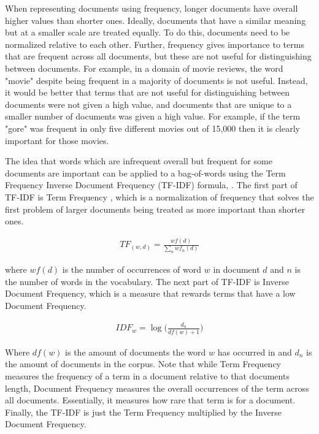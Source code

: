 When representing documents using  frequency, longer documents have overall higher values than shorter ones. Ideally, documents that have a similar meaning but at a smaller scale are treated equally. To do this, documents need to be normalized relative to each other. Further, frequency gives  importance to terms that are frequent across all documents, but these are not useful for distinguishing between documents. For example, in a domain of movie reviews, the word "movie" despite being frequent in a majority of documents is not useful. Instead, it would be better that terms that are not useful for distinguishing between documents were not given a high value, and documents that are unique to a smaller number of documents was given a high value. For example, if the term "gore" was frequent in only five different movies out of 15,000 then it is clearly important for those movies. 

The idea that words which are infrequent overall but frequent for some documents are important can be applied to a bag-of-words using the Term Frequency Inverse Document Frequency (TF-IDF) formula, . The first part of TF-IDF is Term Frequency , which is a normalization of frequency that solves the first problem of larger documents being treated as more important than shorter ones. 

\begin{align*}
TF_{(w, d)} =  \frac{{wf}(d)}{\sum_{n} {wf}_n(d)} 
\end{align*}

where ${wf}(d)$ is the number of occurrences of word $w$ in document $d$ and $n$ is the number of words in the vocabulary.  The next part of TF-IDF is Inverse Document Frequency, which is a measure that rewards terms that have a low Document Frequency. 

\begin{align*}
IDF_{w} =  \log({\frac{d_n}{{df}(w) + 1}) }
\end{align*}

Where ${df}(w)$ is the amount of documents the word $w$ has occurred in and $d_n$ is the amount of documents in the corpus. Note that while Term Frequency measures the frequency of a term in a document relative to that documents length, Document Frequency measures the overall occurrences of the term across all documents. Essentially, it measures how rare that term is for a document.   Finally, the TF-IDF is just the Term Frequency multiplied by the Inverse Document Frequency.

